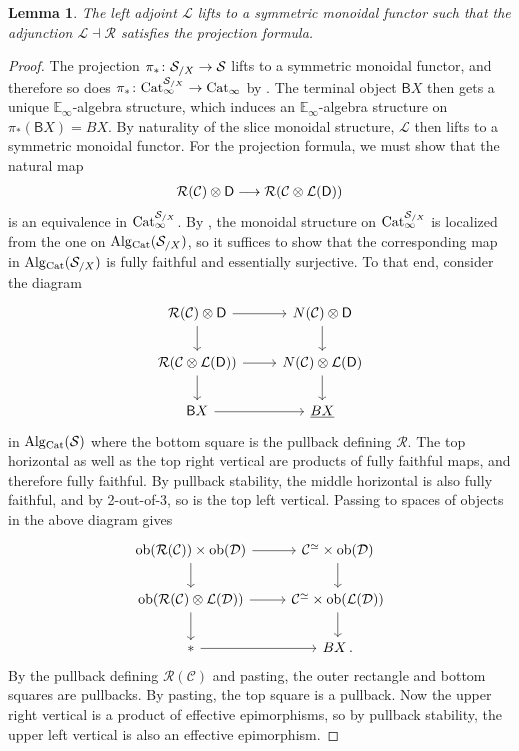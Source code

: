 \documentclass[10pt]{amsart}
\numberwithin{equation}{section}
\newtheorem{lem}[prop]{Lemma}
\theoremstyle{definition}
\DeclareMathOperator{\ob}{ob}
\newcommand{\Cat}{\mathrm{Cat}\vphantom{t}}
\newcommand{\Alg}{\mathrm{Alg}\vphantom{z}}
\newcommand{\bE}{\mathbb{E}}
\newcommand{\cC}{\mathcal{C}}
\newcommand{\calD}{\mathcal{D}}
\newcommand{\cS}{\mathcal{S}}
\newcommand{\cL}{\mathcal{L}}
\newcommand{\cR}{\mathcal{R}}
\newcommand{\sfB}{\mathsf{B}}
\newcommand{\sfD}{\mathsf{D}}
\renewcommand{\to}{\mathchoice{\longrightarrow}{\rightarrow}{}{}}
\begin{document}
	\begin{lem}\label{lem:monoid_projection_formula}
		The left adjoint $\cL$ lifts to a symmetric monoidal functor such that the adjunction $\cL \dashv \cR$ satisfies the projection formula.
	\end{lem}
	\begin{proof}
		The projection $\pi_{*} \colon \cS_{/X} \to \cS$ lifts to a symmetric monoidal functor, and therefore so does $\pi_{*} \colon \Cat_{\infty}^{\cS_{/X}} \to \Cat_{\infty}$ by .
    The terminal object $\sfB X$ then gets a unique $\bE_{\infty}$-algebra structure, which induces an $\bE_{\infty}$-algebra structure on $\pi_{*}(\sfB X) = BX$.
    By naturality of the slice monoidal structure, $\cL$ then lifts to a symmetric monoidal functor.
    For the projection formula, we must show that the natural map
		\begin{align*}
			\cR(\cC) \otimes \sfD \to \cR(\cC \otimes \cL(\sfD))
		\end{align*}
		is an equivalence in $\Cat_{\infty}^{\cS_{/X}}$.
    By , the monoidal structure on $\Cat^{\cS_{/X}}_{\infty}$ is localized from the one on $\Alg_{\Cat}(\cS_{/X})$, so it suffices to show that the corresponding map in $\Alg_{\Cat}(\cS_{/X})$ is fully faithful and essentially surjective.
    To that end, consider the diagram
		\begin{equation*}
			\begin{tikzcd}
				\cR(\cC)\otimes \sfD \arrow[d] \arrow[r] & N(\cC) \otimes \sfD  \arrow[d] \\
				\cR(\cC \otimes \cL(\sfD)) \arrow[r] \arrow[d]      &   N(\cC) \otimes \cL(\sfD)  \arrow[d] \\
				\sfB X  \arrow[r]               &   \underline{BX}
			\end{tikzcd}
		\end{equation*}
		in $\Alg_{\Cat}(\cS)$ where the bottom square is the pullback defining $\cR$.
    The top horizontal as well as the top right vertical are products of fully faithful maps, and therefore fully faithful.
    By pullback stability, the middle horizontal is also fully faithful, and by 2-out-of-3, so is the top left vertical.
    Passing to spaces of objects in the above diagram gives
		\begin{equation*}
			\begin{tikzcd}
				\ob(\cR(\cC) )\times \ob(\calD) \arrow[r] \arrow[d]      &   \cC^{\simeq}\times \ob(\calD)  \arrow[d] \\
				\ob(\cR(\cC)\otimes \cL(\calD))  \arrow[r]  \arrow[d]             &   \cC^{\simeq}\times \ob(\cL(\calD))\arrow[d] \\
				\ast \arrow[r]     &  BX \,.
			\end{tikzcd}
		\end{equation*}
		By the pullback defining $\cR(\cC)$ and pasting, the outer rectangle and bottom squares are pullbacks. By pasting, the top square is a pullback.
    Now the upper right vertical is a product of effective epimorphisms, so by pullback stability, the upper left vertical is also an effective epimorphism.
	\end{proof}
\end{document}
